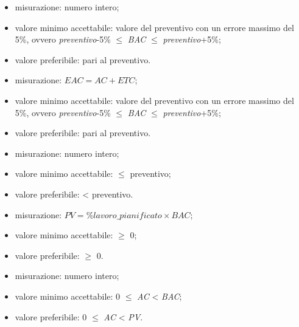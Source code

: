 			\begin{itemize}
				\item{misurazione: numero intero;}
				\item{valore minimo accettabile: valore del preventivo con un errore massimo del 5\%, ovvero \textit{preventivo}-5\% $\leq$ \textit{BAC} $\leq$ \textit{preventivo}+5\%;}
				\item{valore preferibile: pari al preventivo.}
			\end{itemize}
		
			\begin{itemize}
				\item{misurazione: $EAC = AC + ETC$;}
				\item{valore minimo accettabile: valore del preventivo con un errore massimo del 5\%, ovvero \textit{preventivo}-5\% $\leq$ \textit{BAC} $\leq$ \textit{preventivo}+5\%;}
				\item{valore preferibile: pari al preventivo.}
			\end{itemize}
		
			\begin{itemize}
				\item{misurazione: numero intero;}
				\item{valore minimo accettabile: $\leq$ preventivo;}
				\item{valore preferibile: < preventivo.}
			\end{itemize}
		
			\begin{itemize}
				\item{misurazione: $PV = \%lavoro\_pianificato \times BAC$;}
				\item{valore minimo accettabile: $\geq$ 0;}
				\item{valore preferibile: $\geq$ 0.}
			\end{itemize}
		
			\begin{itemize}
				\item{misurazione: numero intero;}
				\item{valore minimo accettabile: 0 $\leq$ \textit{AC} < \textit{BAC};}
				\item{valore preferibile: 0 $\leq$ \textit{AC} < \textit{PV}.}
			\end{itemize}
		
